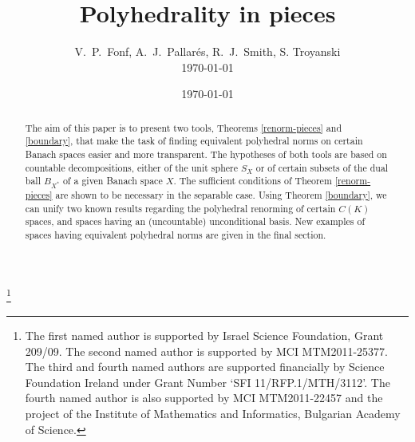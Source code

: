 \documentclass[12pt,a4paper]{amsart}
\theoremstyle{definition}
\theoremstyle{remark}
\newcommand{\ndot}{\ensuremath{\left\|\cdot\right\|}}
\begin{document}
\title{Polyhedrality in pieces}
\begin{abstract}
The aim of this paper is to present two tools, Theorems \ref{renorm-pieces}
and \ref{boundary}, that make the task of finding equivalent polyhedral
norms on certain Banach spaces easier and more transparent. The hypotheses
of both tools are based on countable decompositions, either of the unit
sphere $S_X$ or of certain subsets of the dual ball $B_{X^*}$ of a given
Banach space $X$. The sufficient conditions of Theorem \ref{renorm-pieces}
are shown to be necessary in the separable case. Using Theorem \ref{boundary},
we can unify two known results regarding the polyhedral renorming of certain
$C(K)$ spaces, and spaces having an (uncountable) unconditional basis. New
examples of spaces having equivalent polyhedral norms are given in the final section.
\end{abstract}

\author{V.\ P.\ Fonf, A.\ J.\ Pallar\'es, R.\ J.\ Smith, S. Troyanski\\ \today}

\address{Department of Mathematics, Ben Gurion University of the Negev, Beer-Sheva, Israel}
\address{Departamento de Matem\'aticas, Universidad de Murcia, Campus de
Espinardo, 30100 Murcia (Spain)} 
\address{School of Mathematical Sciences, University College Dublin, Belfield, Dublin 4, Ireland} 
\address{Departamento de Matem\'aticas, Universidad de
Murcia, Campus de Espinardo. 30100 Murcia (Spain).} 

\thanks{The first named author is supported by Israel Science
Foundation, Grant 209/09. The second named author is supported by MCI
MTM2011-25377. The third and fourth named authors are supported
financially by Science Foundation Ireland under Grant Number `SFI
11/RFP.1/MTH/3112'. The fourth named author is also supported by MCI
MTM2011-22457 and the project of the Institute of Mathematics and Informatics,
Bulgarian Academy of Science.}
\date{\today}
\maketitle
\end{document}
